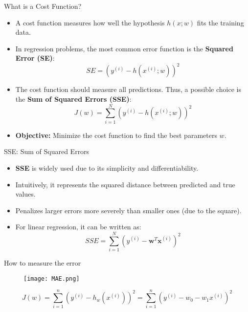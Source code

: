 \documentclass[serif, aspectratio=169]{beamer}
\begin{document}
\begin{frame}{What is a Cost Function?}
    \begin{itemize}
        \item A cost function measures how well the hypothesis 
         $h(x; w)$ fits the training data.
    
        \item In regression problems, the most common error function is the \textbf{Squared Error (SE)}:
        \[
        SE = \left( y^{(i)} - h(x^{(i)}; w) \right)^2
        \]
    
        \item The cost function should measure all predictions. Thus, a possible choice is the \textbf{Sum of Squared Errors (SSE)}:
        \[
        J(w) = \sum_{i=1}^{N} \left( y^{(i)} - h(x^{(i)}; w) \right)^2
        \]

        \item \textbf{Objective:} Minimize the cost function to find the best parameters $w$.
\end{itemize}
\end{frame}

\begin{frame}{SSE: Sum of Squared Errors}
    \begin{itemize}
        \item \textbf{SSE} is widely used due to its simplicity and differentiability.
        \item Intuitively, it represents the squared distance between predicted and true values.
        \item Penalizes larger errors more severely than smaller ones (due to the square).
        \item For linear regression, it can be written as:
        \[
        SSE = \sum_{i=1}^{N} \left( y^{(i)} - \mathbf{w}^T \mathbf{x}^{(i)} \right)^2
        \]
    \end{itemize}    
\end{frame}

\begin{frame}{How to measure the error}

    \begin{figure}[h]
        \centering
        \texttt{[image: MAE.png]} 
    \end{figure}
    \[
    J(w) = \sum_{i=1}^{n} \left( y^{(i)} - h_w(x^{(i)}) \right)^2 = \sum_{i=1}^{n} \left( y^{(i)} - w_0 - w_1 x^{(i)} \right)^2
    \]
\end{frame}
\end{document}
